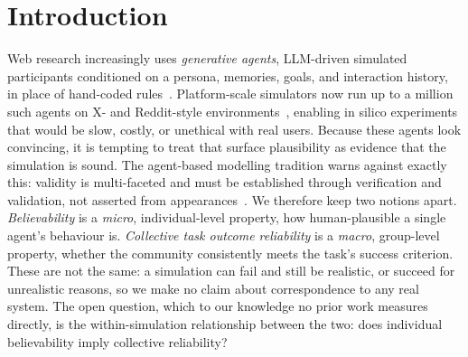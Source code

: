 \documentclass[runningheads]{llncs}
\begin{document}

\section{Introduction}\label{sec:intro}
Web research increasingly uses \emph{generative agents}, LLM-driven simulated
participants conditioned on a persona, memories, goals, and interaction history, in place
of hand-coded rules~\cite{park2023generative,gao2024survey,ghaffarzadegan2024tutorial}.
Platform-scale simulators now run up to a million such agents on X- and Reddit-style
environments~\cite{yang2024oasis,piao2025agentsociety}, enabling in silico experiments
that would be slow, costly, or unethical with real users. Because these agents look
convincing, it is tempting to treat that surface plausibility as evidence that the
simulation is sound. The agent-based modelling tradition warns against exactly this:
validity is multi-faceted and must be established through verification and validation, not
asserted from appearances~\cite{windrum2007empirical,moss2005towards}. We therefore keep
two notions apart. \emph{Believability} is a \emph{micro}, individual-level property, how
human-plausible a single agent's behaviour is. \emph{Collective task outcome reliability}
is a \emph{macro}, group-level property, whether the community consistently meets the
task's success criterion. These are not the same: a simulation can fail and still be
realistic, or succeed for unrealistic reasons, so we make no claim about correspondence to
any real system. The open question, which to our knowledge no prior work measures
directly, is the within-simulation relationship between the two: does individual
believability imply collective reliability?
\end{document}
